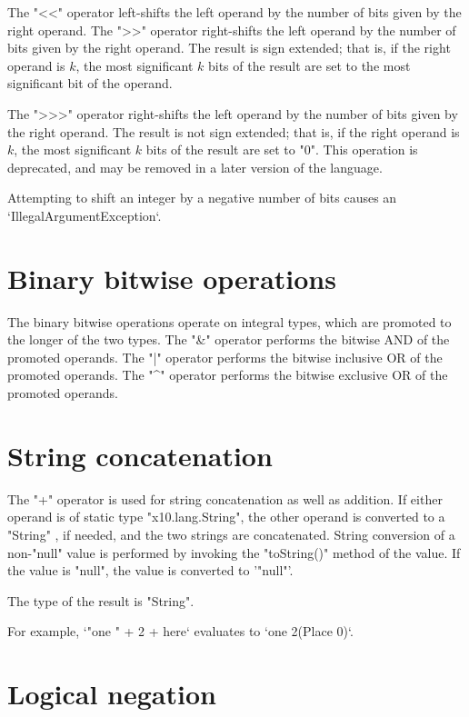 The \xcd"<<" operator left-shifts the left operand by the number of
bits given by the right operand.
The \xcd">>" operator right-shifts the left operand by the number of
bits given by the right operand.  The result is sign extended;
that is, if the right operand is $k$,
the most significant $k$ bits of the result are set to the most
significant bit of the operand.

The \xcd">>>" operator right-shifts the left operand by the number of
bits given by the right operand.  The result is not sign extended;
that is, if the right operand is $k$,
the most significant $k$ bits of the result are set to \xcd"0".
This operation is deprecated, and may be removed in a later version of the
language. 

Attempting to shift an integer by a negative number of bits causes an
\xcd`IllegalArgumentException`. 

\section{Binary bitwise operations}

The binary bitwise operations operate on integral types, which are promoted to
the longer of the two types.
The \xcd"&" operator  performs the bitwise AND of the promoted operands.
The \xcd"|" operator  performs the bitwise inclusive OR of the promoted operands.
The \xcd"^" operator  performs the bitwise exclusive OR of the promoted operands.

\section{String concatenation}

The \xcd"+"  operator is used for string concatenation 
 as well as addition.
If either operand is of static type \xcd"x10.lang.String",
 the other operand is converted to a \xcd"String" , if needed,
  and  the two strings  are concatenated.
 String conversion of a non-\xcd"null" value is  performed by invoking the
 \xcd"toString()" method of the value.
  If the value is \xcd"null", the value is converted to 
  \xcd'"null"'.

The type of the result is \xcd"String".

 For example, 
      \xcd`"one " + 2 + here` 
      evaluates to  \xcd`one 2(Place 0)`.  

\section{Logical negation}

